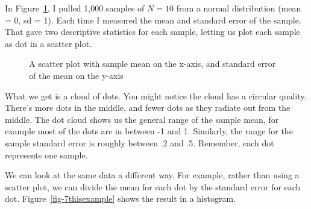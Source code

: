 \documentclass[
  letterpaper,
  DIV=11,
  numbers=noendperiod]{scrreprt}
\begin{document}
In Figure~\ref{fig-7sampleMSEM}, I pulled 1,000 samples of \(N = 10\)
from a normal distribution (mean = 0, sd = 1). Each time I measured the
mean and standard error of the sample. That gave two descriptive
statistics for each sample, letting us plot each sample as dot in a
scatter plot.

\begin{figure}


\caption{\label{fig-7sampleMSEM}A scatter plot with sample mean on the
x-axis, and standard error of the mean on the y-axis}

\end{figure}%

What we get is a cloud of dots. You might notice the cloud has a
circular quality. There's more dots in the middle, and fewer dots as
they radiate out from the middle. The dot cloud shows us the general
range of the sample mean, for example most of the dots are in between -1
and 1. Similarly, the range for the sample standard error is roughly
between .2 and .5. Remember, each dot represents one sample.

We can look at the same data a different way. For example, rather than
using a scatter plot, we can divide the mean for each dot by the
standard error for each dot. Figure~\ref{fig-7thisexample} shows the
result in a histogram.
\end{document}
